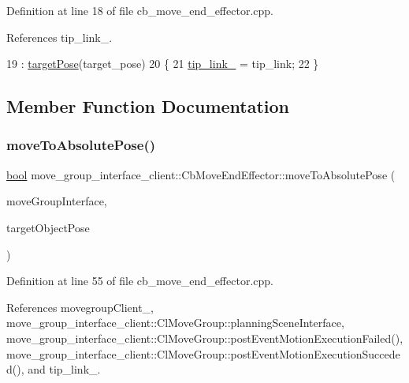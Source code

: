 Definition at line 18 of file cb\+\_\+move\+\_\+end\+\_\+effector.\+cpp.



References tip\+\_\+link\+\_\+.


\begin{DoxyCode}
19   : \hyperlink{classmove__group__interface__client_1_1CbMoveEndEffector_a645e7131ef58ab052efbadf53ea82c59}{targetPose}(target\_pose)
20 \{
21   \hyperlink{classmove__group__interface__client_1_1CbMoveEndEffector_a26d35b0beeb0476a62a46b9b9d659251}{tip\_link\_} = tip\_link;
22 \}
\end{DoxyCode}


\subsection{Member Function Documentation}
\mbox{\label{classmove__group__interface__client_1_1CbMoveEndEffector_a7850f5f9c6fbc040b77e8456a2ecee09}} 
\subsubsection{\texorpdfstring{move\+To\+Absolute\+Pose()}{moveToAbsolutePose()}}
{\footnotesize\ttfamily \hyperlink{classbool}{bool} move\+\_\+group\+\_\+interface\+\_\+client\+::\+Cb\+Move\+End\+Effector\+::move\+To\+Absolute\+Pose (\begin{DoxyParamCaption}\item[{moveit\+::planning\+\_\+interface\+::\+Move\+Group\+Interface \&}]{move\+Group\+Interface,  }\item[{geometry\+\_\+msgs\+::\+Pose\+Stamped \&}]{target\+Object\+Pose }\end{DoxyParamCaption})\hspace{0.3cm}{\ttfamily [protected]}}



Definition at line 55 of file cb\+\_\+move\+\_\+end\+\_\+effector.\+cpp.



References movegroup\+Client\+\_\+, move\+\_\+group\+\_\+interface\+\_\+client\+::\+Cl\+Move\+Group\+::planning\+Scene\+Interface, move\+\_\+group\+\_\+interface\+\_\+client\+::\+Cl\+Move\+Group\+::post\+Event\+Motion\+Execution\+Failed(), move\+\_\+group\+\_\+interface\+\_\+client\+::\+Cl\+Move\+Group\+::post\+Event\+Motion\+Execution\+Succeded(), and tip\+\_\+link\+\_\+.



